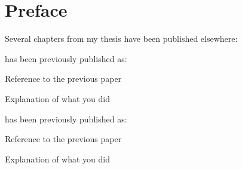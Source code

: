 \chapter*{Preface}

Several chapters from my thesis have been published elsewhere:

\textsc{} has been previously published as:
%
\begin{previouspaper}
  Reference to the previous paper
\end{previouspaper}
%
Explanation of what you did

\textsc{} has been previously published as:
%
\begin{previouspaper}
  Reference to the previous paper
\end{previouspaper}
%
Explanation of what you did

